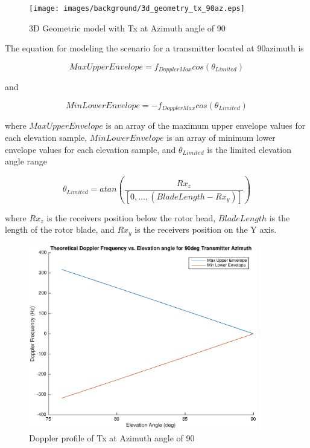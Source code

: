 \begin{figure}
	\begin{center}
		\texttt{[image: images/background/3d\_geometry\_tx\_90az.eps]}
		\caption{3D Geometric model with Tx at Azimuth angle of 90\textdegree}
		\label{fig:3D_model_90az}
	\end{center}
\end{figure}

The equation for modeling the scenario for a transmitter located at 90\textdegree \space azimuth is

\begin{equation}
	MaxUpperEnvelope = f_{DopplerMax}cos(\theta_{Limited})
	\label{eq:theory_90_upper}
\end{equation}

and

\begin{equation}
	MinLowerEnvelope = -f_{DopplerMax}cos(\theta_{Limited})
	\label{eq:theory_90_lower}
\end{equation}

where $MaxUpperEnvelope$ is an array of the maximum upper envelope values for each elevation sample, $MinLowerEnvelope$ is an array of minimum lower envelope values for each elevation sample, and $\theta_{Limited}$ is the limited elevation angle range

\begin{equation}
	\theta_{Limited} = atan\left(\frac{Rx_z}{[0,\dots, (BladeLength - Rx_y)]}\right)
	\label{eq:theory_90_limited}
\end{equation}

where $Rx_z$ is the receivers position below the rotor head, $BladeLength$ is the length of the rotor blade, and $Rx_y$ is the receivers position on the Y axis.

\begin{figure}
	\begin{center}
		\includegraphics[width=10cm]{images/background/3d_geometry_tx_90az_doppler_profile.eps}
		\caption{Doppler profile of Tx at Azimuth angle of 90\textdegree}
		\label{fig:3D_model_90az_doppler}
	\end{center}
\end{figure}

